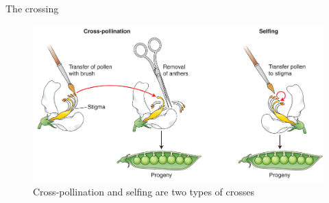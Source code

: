 \documentclass[11pt,ignorenonframetext,aspectratio=169]{beamer}
\begin{document}
\begin{frame}{The crossing}
\protect\hypertarget{the-crossing}{}
\begin{figure}
\includegraphics[width=0.8\linewidth]{../images/crossing_selfing} \caption{Cross-pollination and selfing are two types of crosses}\label{fig:crossing-pea}
\end{figure}
\end{frame}
\end{document}
